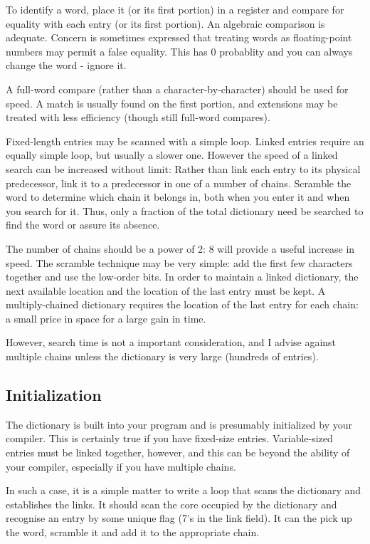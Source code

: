 \documentclass[b5paper, oneside]{book}
\begin{document}
To identify a word, place it (or its first portion) in a register and compare for equality with each entry (or its first portion). An algebraic comparison is adequate. Concern is sometimes expressed that treating words as floating-point numbers may permit a false equality. This has 0 probablity and you can always change the word - ignore it.

A full-word compare (rather than a character-by-character) should be used for speed. A match is usually found on the first portion, and extensions may be treated with less efficiency (though still full-word compares).

Fixed-length entries may be scanned with a simple loop. Linked entries require an equally simple loop, but usually a slower one. However the speed of a linked search can be increased without limit: Rather than link each entry to its physical predecessor, link it to a predecessor in one of a number of chains. Scramble the word to determine which chain it belongs in, both when you enter it and when you search for it. Thus, only a fraction of the total dictionary need be searched to find the word or assure its absence.

The number of chains should be a power of 2: 8 will provide a useful increase in speed. The scramble technique may be very simple: add the first few characters together and use the low-order bits. In order to maintain a linked dictionary, the next available location and the location of the last entry must be kept. A multiply-chained dictionary requires the location of the last entry for each chain: a small price in space for a large gain in time.

However, search time is not a important consideration, and I advise against multiple chains unless the dictionary is very large (hundreds of entries).

\subsection{Initialization}
The dictionary is built into your program and is presumably initialized by your compiler. This is certainly true if you have fixed-size entries. Variable-sized entries must be linked together, however, and this can be beyond the ability of your compiler, especially if you have multiple chains.

In such a case, it is a simple matter to write a loop that scans the dictionary and establishes the links. It should scan the core occupied by the dictionary and recognise an entry by some unique flag (7's in the link field). It can the pick up the word, scramble it and add it to the appropriate chain.
\end{document}
